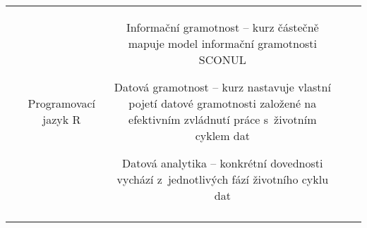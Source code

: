 \begin{landscape}
\begin{table}[htbp]
{\begin{tabularx}{\linewidth}{CCCCC}
&

Programovací jazyk R

&

Informační gramotnost – kurz částečně mapuje model informační gramotnosti SCONUL

Datová gramotnost – kurz nastavuje vlastní pojetí datové gramotnosti založené na efektivním zvládnutí práce s~životním cyklem dat 

Datová analytika – konkrétní dovednosti vychází z~jednotlivých fází životního cyklu dat

\\

\tabularnewline
\bottomrule
\end{tabularx}

}

\end{table}

\end{landscape}